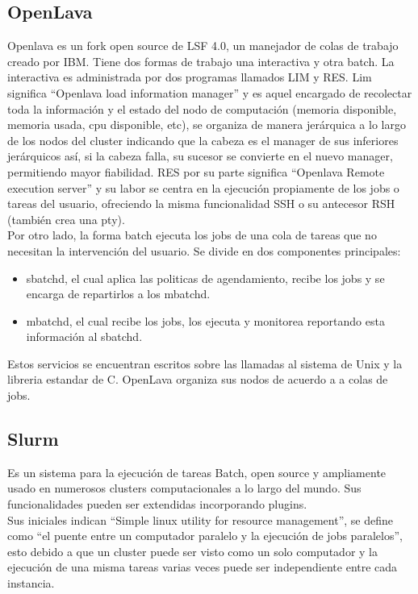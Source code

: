 \subsection{OpenLava}
Openlava \cite{OpenlavaArch} es un fork open source de LSF 4.0, un manejador de colas de trabajo creado por IBM. Tiene dos formas de trabajo una interactiva y otra batch. La interactiva es administrada por dos programas llamados LIM y RES. Lim significa “Openlava load information manager” y es aquel encargado de recolectar toda la información y el estado del nodo de  computación (memoria disponible, memoria usada, cpu disponible, etc), se organiza de manera jerárquica a lo largo de los nodos del cluster indicando que la cabeza es el manager de sus inferiores jerárquicos así, si la cabeza falla, su sucesor se convierte en el nuevo manager, permitiendo mayor fiabilidad. RES por su parte significa “Openlava Remote execution server” y su labor se centra en la ejecución propiamente de los jobs o tareas del usuario, ofreciendo la misma funcionalidad SSH o su antecesor RSH (también crea una pty).  \\

Por otro lado, la forma batch ejecuta los jobs de una cola de tareas que no necesitan la intervención del usuario. Se divide en dos componentes principales:

\begin{itemize}
\item sbatchd, el cual aplica las politicas de agendamiento, recibe los jobs y se encarga de repartirlos a los mbatchd.
\item mbatchd, el cual recibe los jobs, los ejecuta y monitorea reportando esta información al sbatchd.
\end{itemize}

Estos servicios se encuentran escritos sobre las llamadas al sistema de Unix y la libreria estandar de C. OpenLava organiza sus nodos de acuerdo a a colas de jobs.

\subsection{Slurm}
Es un sistema para la ejecución de tareas Batch, open source y ampliamente usado en numerosos clusters computacionales a lo largo del mundo. Sus funcionalidades pueden ser extendidas incorporando plugins.\\

Sus iniciales indican “Simple linux utility for resource management”, se define como “el puente entre un computador paralelo y la ejecución de jobs paralelos”, esto debido a que un cluster puede ser visto como un solo computador y la ejecución de una misma tareas varias veces puede ser independiente entre cada instancia.\\

